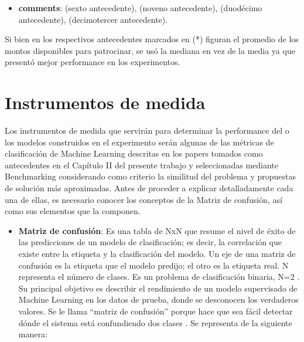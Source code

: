 \begin{itemize}
	\item \textbf{comments}: \citeauthor{pr_li2016predcrowd} (sexto antecedente), \citeauthor{pr_kaur2017socmedcrowd} (noveno antecedente), \citeauthor{pr_lee2018contentDL} (duodécimo antecedente), \citeauthor{pr_jin2019dayssuccess} (decimotercer antecedente).
\end{itemize}

Si bien en los respectivos antecedentes marcados en (*) figuran el promedio de los montos disponibles para patrocinar, se usó la mediana en vez de la media ya que presentó mejor performance en los experimentos.

\section{Instrumentos de medida}
Los instrumentos de medida que servirán para determinar la performance del o los modelos construidos en el experimento serán algunas de las métricas de clasificación de Machine Learning descritas en los papers tomados como antecedentes en el Capítulo II del presente trabajo y seleccionadas mediante Benchmarking considerando como criterio la similitud del problema y propuestas de solución más aproximadas. Antes de proceder a explicar detalladamente cada una de ellas, es necesario conocer los conceptos de la Matriz de confusión, así como sus elementos que la componen.

\begin{itemize}
	\item \textbf{Matriz de confusión}: Es una tabla de NxN que resume el nivel de éxito de las predicciones de un modelo de clasificación; es decir, la correlación que existe entre la etiqueta y la clasificación del modelo. Un eje de una matriz de confusión es la etiqueta que el modelo predijo; el otro es la etiqueta real. N representa el número de clases. Es un problema de clasificación binaria, N=2 \parencite{gl_kohavi1998ml_glossary}. Su principal objetivo es describir el rendimiento de un modelo supervisado de Machine Learning en los datos de prueba, donde se desconocen los verdaderos valores. Se le llama “matriz de confusión” porque hace que sea fácil detectar dónde el sistema está confundiendo dos clases \parencite{gl_bigdata2019metricas}. Se representa de la siguiente manera:
\end{itemize}

